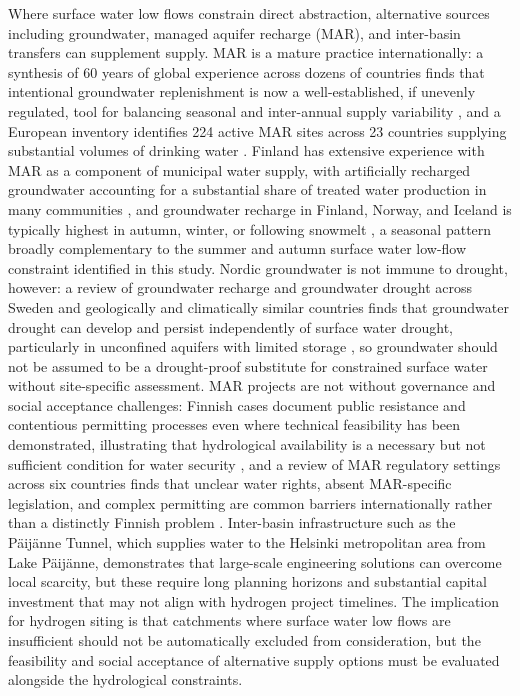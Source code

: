 \documentclass[draft]{agujournal2019}
\begin{document}
Where surface water low flows constrain direct abstraction, alternative sources including groundwater, managed aquifer recharge (MAR), and inter-basin transfers can supplement supply. MAR is a mature practice internationally: a synthesis of 60 years of global experience across dozens of countries finds that intentional groundwater replenishment is now a well-established, if unevenly regulated, tool for balancing seasonal and inter-annual supply variability \cite{Dillon2019}, and a European inventory identifies 224 active MAR sites across 23 countries supplying substantial volumes of drinking water \cite{Sprenger2017}. Finland has extensive experience with MAR as a component of municipal water supply, with artificially recharged groundwater accounting for a substantial share of treated water production in many communities \cite{kurki2013managed}, and groundwater recharge in Finland, Norway, and Iceland is typically highest in autumn, winter, or following snowmelt \cite{Klove2017}, a seasonal pattern broadly complementary to the summer and autumn surface water low-flow constraint identified in this study. Nordic groundwater is not immune to drought, however: a review of groundwater recharge and groundwater drought across Sweden and geologically and climatically similar countries finds that groundwater drought can develop and persist independently of surface water drought, particularly in unconfined aquifers with limited storage \cite{Barthel2021}, so groundwater should not be assumed to be a drought-proof substitute for constrained surface water without site-specific assessment. MAR projects are not without governance and social acceptance challenges: Finnish cases document public resistance and contentious permitting processes even where technical feasibility has been demonstrated, illustrating that hydrological availability is a necessary but not sufficient condition for water security \cite{laukka2021creating}, and a review of MAR regulatory settings across six countries finds that unclear water rights, absent MAR-specific legislation, and complex permitting are common barriers internationally rather than a distinctly Finnish problem \cite{Seidl2026}. Inter-basin infrastructure such as the P\"aij\"anne Tunnel, which supplies water to the Helsinki metropolitan area from Lake P\"aij\"anne, demonstrates that large-scale engineering solutions can overcome local scarcity, but these require long planning horizons and substantial capital investment that may not align with hydrogen project timelines. The implication for hydrogen siting is that catchments where surface water low flows are insufficient should not be automatically excluded from consideration, but the feasibility and social acceptance of alternative supply options must be evaluated alongside the hydrological constraints.
\end{document}
